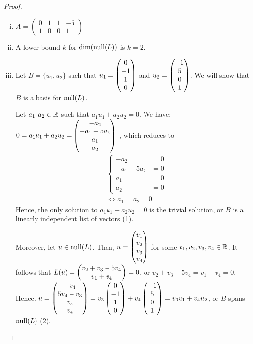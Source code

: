 \begin{proof}
    \renewcommand{\qedsymbol}{$\blacksquare$}
    \begin{enumerate}[(i)]
        \item $A=\begin{pmatrix}
            0 & 1 & 1 & -5\\
            1 & 0 & 0 & 1
        \end{pmatrix}$
        \item A lower bound $k$ for $\textnormal{dim}(\textnormal{null}(L))$ is $k=2$.
        \item Let $B=\{u_1,u_2\}$ such that $u_1=\begin{pmatrix} 0\\ -1\\1 \\ 0\end{pmatrix}$ and $u_2=\begin{pmatrix} -1\\ 5\\0 \\ 1\end{pmatrix}$.
        We will show that $B$ is a basis for $\textnormal{null}(L)$.
        
        Let $a_1,a_2\in\mathbb R$ such that $a_1u_1+a_2u_2=0$. We have: $0
        = a_1u_1+a_2u_2
        = \begin{pmatrix} -a_2\\ -a_1+5a_2\\a_1 \\ a_2\end{pmatrix}$
        , which reduces to
        \begin{align*}
            &\begin{cases}
                -a_2&=0\\
                -a_1+5a_2&=0\\
                a_1&=0\\
                a_2&=0
            \end{cases}\\&\iff
            a_1=a_2=0
        \end{align*}
        Hence, the only solution to $a_1u_1+a_2u_2=0$ is the trivial solution, or $B$ is a linearly independent list of vectors (1).
        
        Moreover, let $u\in\textnormal{null}(L)$.
        Then, $u=\begin{pmatrix} v_1\\ v_2\\v_3 \\ v_4\end{pmatrix}$ for some $v_1,v_2,v_3,v_4\in\mathbb R$.
        It follows that $L(u)=\begin{pmatrix} v_2+v_3-5v_4\\ v_1+v_4\end{pmatrix}=0$, or $v_2+v_3-5v_4=v_1+v_4=0$.
        Hence, $u=\begin{pmatrix} -v_4\\ 5v_4-v_3\\v_3 \\ v_4\end{pmatrix}=v_3 \begin{pmatrix} 0\\ -1\\1 \\ 0\end{pmatrix}+v_4 \begin{pmatrix} -1\\ 5\\0 \\ 1\end{pmatrix}=v_3u_1+v_4u_2$, or $B$ spans $\textnormal{null}(L)$ (2).


\end{enumerate}
\end{proof}
